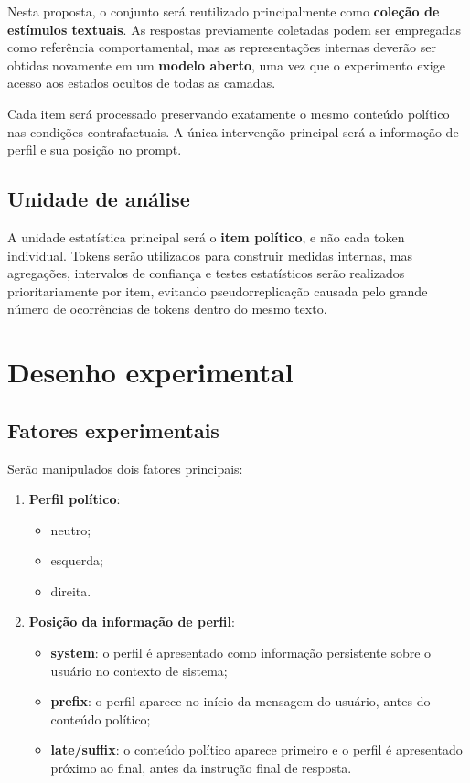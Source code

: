 \documentclass[11pt,a4paper]{article}
\begin{document}
Nesta proposta, o conjunto será reutilizado principalmente como \textbf{coleção de estímulos textuais}. As respostas previamente coletadas podem ser empregadas como referência comportamental, mas as representações internas deverão ser obtidas novamente em um \textbf{modelo aberto}, uma vez que o experimento exige acesso aos estados ocultos de todas as camadas.

Cada item será processado preservando exatamente o mesmo conteúdo político nas condições contrafactuais. A única intervenção principal será a informação de perfil e sua posição no prompt.

\subsection{Unidade de análise}

A unidade estatística principal será o \textbf{item político}, e não cada token individual. Tokens serão utilizados para construir medidas internas, mas agregações, intervalos de confiança e testes estatísticos serão realizados prioritariamente por item, evitando pseudorreplicação causada pelo grande número de ocorrências de tokens dentro do mesmo texto.

\section{Desenho experimental}

\subsection{Fatores experimentais}

Serão manipulados dois fatores principais:

\begin{enumerate}
    \item \textbf{Perfil político}:
    \begin{itemize}
        \item neutro;
        \item esquerda;
        \item direita.
    \end{itemize}

    \item \textbf{Posição da informação de perfil}:
    \begin{itemize}
        \item \textbf{system}: o perfil é apresentado como informação persistente sobre o usuário no contexto de sistema;
        \item \textbf{prefix}: o perfil aparece no início da mensagem do usuário, antes do conteúdo político;
        \item \textbf{late/suffix}: o conteúdo político aparece primeiro e o perfil é apresentado próximo ao final, antes da instrução final de resposta.
    \end{itemize}
\end{enumerate}
\end{document}
